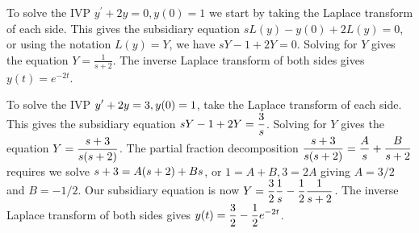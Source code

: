 \begin{example}
To solve the IVP $y^\prime +2y =0, y(0)=1$ we start by taking the Laplace transform of each side. This gives the subsidiary equation $sL(y)-y(0)+2L(y) = 0$, or using the notation $L(y)=Y$, we have $sY-1+2Y=0$.  Solving for $Y$ gives the equation $Y=\frac{1}{s+2}$. The inverse Laplace transform of both sides gives $y(t) = e^{-2t}$.  
\end{example}

\begin{example}
To solve the IVP $\displaystyle y^\prime +2y =3, y(0)=1$, take the Laplace transform of each side. This gives the subsidiary equation $\displaystyle sY-1+2Y=\frac{3}{s}$.  Solving for $Y$ gives the equation $\displaystyle Y=\frac{s+3}{s(s+2)}$. The partial fraction decomposition $\displaystyle \frac{s+3}{s(s+2)}=\frac{A}{s}+\frac{B}{s+2}$ requires we solve $\displaystyle s+3 = A(s+2)+Bs$, or $1=A+B, 3=2A$ giving  $A=3/2$ and $B=-1/2$. Our subsidiary equation is now $\displaystyle Y = \frac{3}{2}\frac{1}{s}-\frac{1}{2}\frac{1}{s+2}$. The inverse Laplace transform of both sides gives $\displaystyle y(t) = \frac{3}{2}-\frac{1}{2}e^{-2t}$. 
\end{example}




